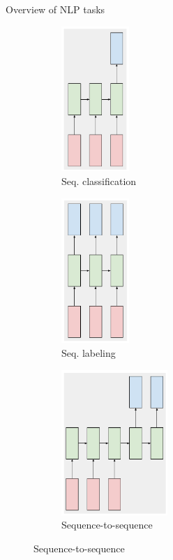 \documentclass[12pt,aspectratio=169,handout]{beamer}
\begin{document}
\begin{frame}{Overview of NLP tasks}
	
	\begin{figure}
		\centering
		\begin{subfigure}[b]{0.28\textwidth}
			\centering
			\includegraphics[height=5.5cm]{sequence_classification.pdf}
			\caption{Seq. classification}
			\label{fig:seqclf}
		\end{subfigure}
		\hfill
		\begin{subfigure}[b]{0.28\textwidth}
			\centering
			\includegraphics[height=5.5cm]{sequence_labeling.pdf}
			\caption{Seq. labeling}
			\label{fig:seqlab}
		\end{subfigure}
		\hfill
		\begin{subfigure}[b]{0.4\textwidth}
			\centering
			\includegraphics[height=5.5cm]{seq2seq.pdf}
			\caption{Sequence-to-sequence}
			\label{fig:seq2seq}
		\end{subfigure}
	\end{figure}
	
\end{frame}
\end{document}
